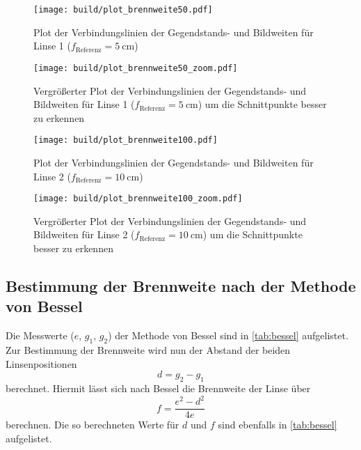 \begin{figure}
    \centering
    \texttt{[image: build/plot\_brennweite50.pdf]}
    \caption{Plot der Verbindungslinien der Gegendstands- und Bildweiten für Linse 1 ($f_\text{Referenz}=\SI{5}{\centi\metre}$)}
    \label{fig:plot_brennweite50}
\end{figure}

\begin{figure}
    \centering
    \texttt{[image: build/plot\_brennweite50\_zoom.pdf]}
    \caption{Vergrößerter Plot der Verbindungslinien der Gegendstands- und Bildweiten für Linse 1 ($f_\text{Referenz}=\SI{5}{\centi\metre}$) um die Schnittpunkte besser zu erkennen}
    \label{fig:plot_brennweite50_zoom}
\end{figure}

\begin{figure}
    \centering
    \texttt{[image: build/plot\_brennweite100.pdf]}
    \caption{Plot der Verbindungslinien der Gegendstands- und Bildweiten für Linse 2 ($f_\text{Referenz}=\SI{10}{\centi\metre}$)}
    \label{fig:plot_brennweite100}
\end{figure}

\begin{figure}
    \centering
    \texttt{[image: build/plot\_brennweite100\_zoom.pdf]}
    \caption{Vergrößerter Plot der Verbindungslinien der Gegendstands- und Bildweiten für Linse 2 ($f_\text{Referenz}=\SI{10}{\centi\metre}$) um die Schnittpunkte besser zu erkennen}
    \label{fig:plot_brennweite100_zoom}
\end{figure}



\subsection{Bestimmung der Brennweite nach der Methode von Bessel}
\label{ssec:Auswertung_bessel}

Die Messwerte ($e$, $g_1$, $g_2$) der Methode von Bessel sind in \autoref{tab:bessel} aufgelistet.
Zur Bestimmung der Brennweite wird nun der Abstand der beiden Linsenpositionen
\begin{equation}
    d = g_2 - g_1
    \label{eq:d}
\end{equation}
berechnet.
Hiermit lässt sich nach Bessel die Brennweite der Linse über
\begin{equation}
    f = \frac{e^2-d^2}{4e}
    \label{eq:bessel}
\end{equation}
berechnen.
Die so berechneten Werte für $d$ und $f$ sind ebenfalls in \autoref{tab:bessel} aufgelistet.

